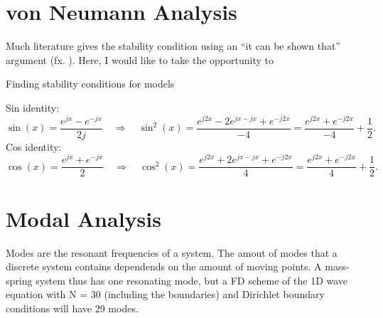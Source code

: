 \section{von Neumann Analysis}\label{sec:stabilityAnalysis}
Much literature gives the stability condition using an ``it can be shown that'' argument (fx. \cite{Bilbao2009}). Here, I would like to take the opportunity to 

Finding stability conditions for models

Sin identity:
\begin{equation}\label{eq:sinIdentity}
    \sin(x) = \frac{e^{jx} - e^{-jx}}{2j}\quad \Longrightarrow \quad \sin^2(x) = \frac{e^{j2x} - 2e^{jx-jx}+ e^{-j2x}}{-4} = \frac{e^{j2x} + e^{-j2x}}{-4} + \frac{1}{2}.
\end{equation}
Cos identity:
\begin{equation}\label{eq:cosIdentity}
    \cos(x) = \frac{e^{jx} + e^{-jx}}{2}\quad \Longrightarrow \quad \cos^2(x) = \frac{e^{j2x} + 2e^{jx-jx}+ e^{-j2x}}{4} = \frac{e^{j2x} + e^{-j2x}}{4} + \frac{1}{2}.
\end{equation}

\section{Modal Analysis}
\label{sec:modalAnalysis}
Modes are the resonant frequencies of a system. The amout of modes that a discrete system contains dependends on the amount of moving points. A mass-spring system thus has one resonating mode, but a FD scheme of the 1D wave equation with N = 30 (including the boundaries) and Dirichlet boundary conditions will have 29 modes.


